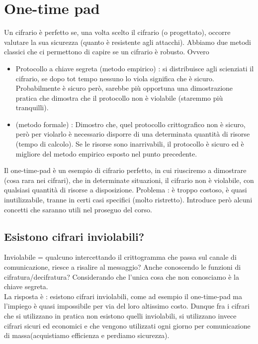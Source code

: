 \chapter{One-time pad}

Un cifrario è perfetto se, una volta scelto il cifrario (o progettato), occorre valutare la sua sicurezza (quanto è resistente agli attacchi). Abbiamo due metodi classici che ci permettono di capire se un cifrario è robusto. Ovvero
\begin{itemize}
	\item Protocollo a chiave segreta (metodo empirico) : si distribuisce agli scienziati il cifrario, se dopo tot tempo nessuno lo viola significa che è sicuro. Probabilmente è sicuro però, sarebbe più opportuna una dimostrazione pratica che dimostra che il protocollo non è violabile (staremmo più tranquilli).
	\item (metodo formale) : Dimostro che, quel protocollo crittografico non è sicuro, però per violarlo è necessario disporre di una determinata quantità di risorse (tempo di calcolo). Se le risorse sono inarrivabili, il protocollo è sicuro ed è migliore del metodo empirico esposto nel punto precedente.
\end{itemize}

Il one-time-pad è un esempio di cifrario perfetto, in cui riusciremo a dimostrare (cosa rara nei cifrari), che in determinate situazioni, il cifrario non è violabile, con qualsiasi quantità di risorse a disposizione. Problema : è troppo costoso, è quasi inutilizzabile, tranne in certi casi specifici (molto ristretto).
Introduce però alcuni concetti che saranno utili nel proseguo del corso.

\section{Esistono cifrari inviolabili?}

Inviolabile = qualcuno intercettando il crittogramma che passa sul canale di comunicazione, riesce a risalire al messaggio? Anche conoscendo le funzioni di cifratura/decifratura? Considerando che l'unica cosa che non conosciamo è la chiave segreta.
\\
La risposta è : esistono cifrari inviolabili, come ad esempio il one-time-pad ma l'impiego è quasi impossibile per via del loro altissimo costo. Dunque fra i cifrari che si utilizzano in pratica non esistono quelli inviolabili, si utilizzano invece cifrari sicuri ed economici e che vengono utilizzati ogni giorno per comunicazione di massa(acquistiamo efficienza e perdiamo sicurezza).

